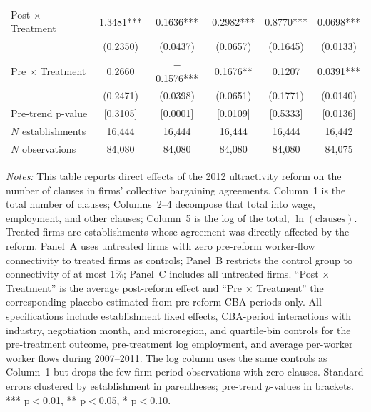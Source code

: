 \begin{table}[!htbp]
\begin{tabular}{lccccc}
Post $\times$ Treatment & 1.3481*** & 0.1636*** & 0.2982*** & 0.8770*** & 0.0698***\\
 & (0.2350) & (0.0437) & (0.0657) & (0.1645) & (0.0133)\\
Pre $\times$ Treatment & 0.2660 & $-$0.1576*** & 0.1676** & 0.1207 & 0.0391***\\
 & (0.2471) & (0.0398) & (0.0651) & (0.1771) & (0.0140)\\
Pre-trend p-value & [0.3105] & [0.0001] & [0.0109] & [0.5333] & [0.0136]\\
$N$ establishments & 16{,}444 & 16{,}444 & 16{,}444 & 16{,}444 & 16{,}442\\
$N$ observations & 84{,}080 & 84{,}080 & 84{,}080 & 84{,}080 & 84{,}075\\
\bottomrule
\end{tabular}
\begin{minipage}{\linewidth}
\footnotesize\vspace{4pt}
\textit{Notes:} This table reports direct effects of the 2012 ultractivity reform on the number of clauses in firms' collective bargaining agreements. Column~1 is the total number of clauses; Columns~2--4 decompose that total into wage, employment, and other clauses; Column~5 is the log of the total, $\ln(\text{clauses})$. Treated firms are establishments whose agreement was directly affected by the reform. Panel~A uses untreated firms with zero pre-reform worker-flow connectivity to treated firms as controls; Panel~B restricts the control group to connectivity of at most 1\%; Panel~C includes all untreated firms. ``Post $\times$ Treatment'' is the average post-reform effect and ``Pre $\times$ Treatment'' the corresponding placebo estimated from pre-reform CBA periods only. All specifications include establishment fixed effects, CBA-period interactions with industry, negotiation month, and microregion, and quartile-bin controls for the pre-treatment outcome, pre-treatment log employment, and average per-worker worker flows during 2007--2011. The log column uses the same controls as Column~1 but drops the few firm-period observations with zero clauses. Standard errors clustered by establishment in parentheses; pre-trend $p$-values in brackets. *** p$<$0.01, ** p$<$0.05, * p$<$0.10.
\end{minipage}
\end{table}
